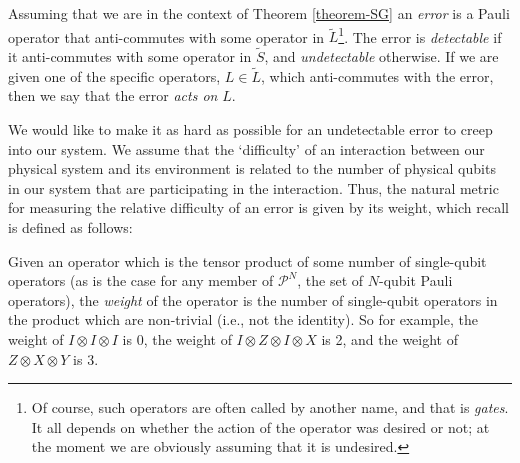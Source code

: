 \documentclass[twocolumn,showpacs,preprintnumbers,amsmath,amssymb,nofootinbib,pra,floatfix]{revtex4}
\newenvironment{definition}[1][Definition]{\begin{trivlist}
\item[\hskip \labelsep {\bfseries #1}]}{\end{trivlist}}
\newcommand{\set}{\tilde}
\begin{document}
\begin{definition}
Assuming that we are in the context of Theorem \ref{theorem-SG} an \emph{error} is a Pauli operator that anti-commutes with some operator in $\set L$\footnote{Of course, such operators are often called by another name, and that is \emph{gates}.  It all depends on whether the action of the operator was desired or not;  at the moment we are obviously assuming that it is undesired.}.  The error is \emph{detectable} if it anti-commutes with some operator in $\set S$, and \emph{undetectable} otherwise.  If we are given one of the specific operators, $L\in \set L$, which anti-commutes with the error, then we say that the error \emph{acts on} $L$.
\end{definition}

We would like to make it as hard as possible for an undetectable error to creep into our system.  We assume that the `difficulty' of an interaction between our physical system and its environment is related to the number of physical qubits in our system that are participating in the interaction.  Thus, the natural metric for measuring the relative difficulty of an error is given by its weight, which recall is defined as follows:

\begin{definition}
Given an operator which is the tensor product of some number of single-qubit operators (as is the case for any member of $\mathscr{P}^N$, the set of $N$-qubit Pauli operators), the \emph{weight} of the operator is the number of single-qubit operators in the product which are non-trivial (i.e., not the identity).  So for example, the weight of $I\otimes I\otimes I$ is 0, the weight of $I\otimes Z\otimes I\otimes X$ is 2, and the weight of $Z\otimes X\otimes Y$ is 3.
\end{definition}
\end{document}
